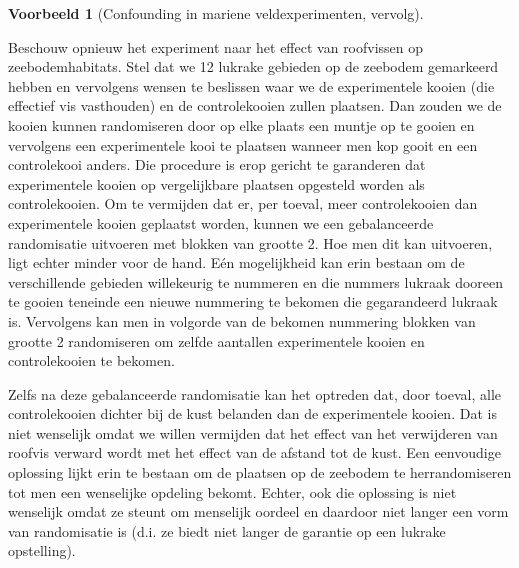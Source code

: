 \documentclass[
  12pt,dutch,coursenotes]{book}
\theoremstyle{definition}
\theoremstyle{definition}
\newtheorem{example}{Voorbeeld}[chapter]
\theoremstyle{definition}
\theoremstyle{definition}
\theoremstyle{remark}
\begin{document}
\begin{example}[Confounding in mariene veldexperimenten, vervolg]
\protect\hypertarget{exm:unnamed-chunk-71}{}{\label{exm:unnamed-chunk-71} {} }
\end{example}
Beschouw opnieuw het experiment naar het effect van roofvissen op zeebodemhabitats. Stel dat we 12 lukrake gebieden op de zeebodem gemarkeerd hebben en vervolgens wensen te beslissen waar we de experimentele kooien (die effectief vis vasthouden) en de controlekooien zullen plaatsen. Dan zouden we de kooien kunnen randomiseren door op elke plaats een muntje op te gooien en vervolgens een experimentele kooi te plaatsen wanneer men kop gooit en een controlekooi anders. Die procedure is erop gericht te garanderen dat experimentele kooien op vergelijkbare plaatsen opgesteld worden als controlekooien. Om te vermijden dat er, per toeval, meer controlekooien dan experimentele kooien geplaatst worden, kunnen we een gebalanceerde randomisatie uitvoeren met blokken van grootte 2. Hoe men dit kan uitvoeren, ligt echter minder voor de hand. Eén mogelijkheid kan erin bestaan om de verschillende gebieden willekeurig te nummeren en die nummers lukraak dooreen te gooien teneinde een nieuwe nummering te bekomen die gegarandeerd lukraak is. Vervolgens kan men in volgorde van de bekomen nummering blokken van grootte 2 randomiseren om zelfde aantallen experimentele kooien en controlekooien te bekomen.

Zelfs na deze gebalanceerde randomisatie kan het optreden dat, door toeval, alle controlekooien dichter bij de kust belanden dan de experimentele kooien. Dat is niet wenselijk omdat we willen vermijden dat het effect van het verwijderen van roofvis verward wordt met het effect van de afstand tot de kust. Een eenvoudige oplossing lijkt erin te bestaan om de plaatsen op de zeebodem te herrandomiseren tot men een wenselijke opdeling bekomt. Echter, ook die oplossing is niet wenselijk omdat ze steunt om menselijk oordeel en daardoor niet langer een vorm van randomisatie is (d.i. ze biedt niet langer de garantie op een lukrake opstelling).
\end{document}
